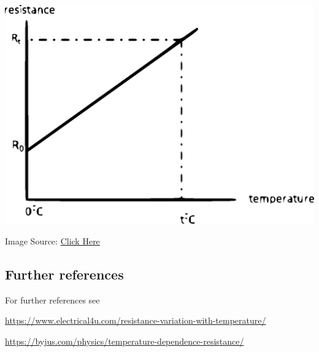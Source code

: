 \includegraphics{hee.eps}


Image Source:
\href{https://electricstudents.blogspot.com/2017/06/effect-of-temperature-on-resistance-and.html}{Click Here}
    
\subsection{Further references}    

For further references see    


\url{https://www.electrical4u.com/resistance-variation-with-temperature/}
    
\url{https://byjus.com/physics/temperature-dependence-resistance/}
    
